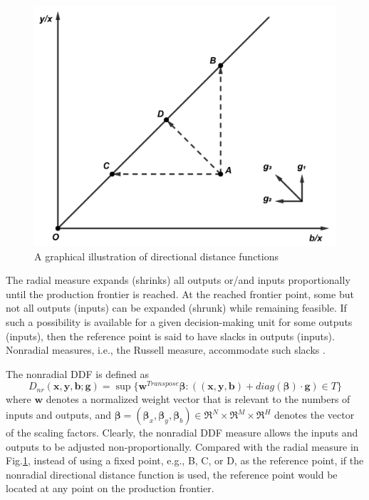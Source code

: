\begin{figure}[ht]
    \centering
    \includegraphics[scale=0.5]{SJF1.pdf}
    \caption{A graphical illustration of directional distance functions} 
    \label{fig_ddf}
\end{figure}

The radial measure expands (shrinks) all outputs or/and inputs proportionally until the production frontier is reached. At the reached frontier point, some but not all outputs (inputs) can be expanded (shrunk) while remaining feasible. If such a possibility is available for a given decision-making unit for some outputs (inputs), then the reference point is said to have slacks in outputs (inputs). Nonradial measures, i.e., the Russell measure, accommodate such slacks \citep{Chambers2002,Fare2010,Zhou2012}.

The nonradial DDF is defined as
\begin{equation}\label{eq_ddf_nr}
    D_{nr} (\pmb{x},\pmb{y},\pmb{b};\pmb{g}) = \sup \{ \pmb{w}^{Transpose} \pmb{\beta} :((\pmb{x},\pmb{y},\pmb{b}) + \textit{diag}(\pmb{\beta}) \cdot \pmb{g}) \in T \} 
\end{equation}
where $\pmb{w}$ denotes a normalized weight vector that is relevant to the numbers of inputs and outputs, and ${\pmb{\beta }} = ({{\pmb{\beta }}_x},{{\pmb{\beta }}_y},{{\pmb{\beta }}_b}) \in {\Re ^N} \times {\Re ^M} \times {\Re ^H}$ denotes the vector of the scaling factors. 
Clearly, the nonradial DDF measure allows the inputs and outputs to be adjusted non-proportionally. Compared with the radial measure in Fig.\ref{fig_ddf}, instead of using a fixed point, e.g., B, C, or D, as the reference point, if the nonradial directional distance function is used, the reference point would be located at any point on the production frontier.
 

